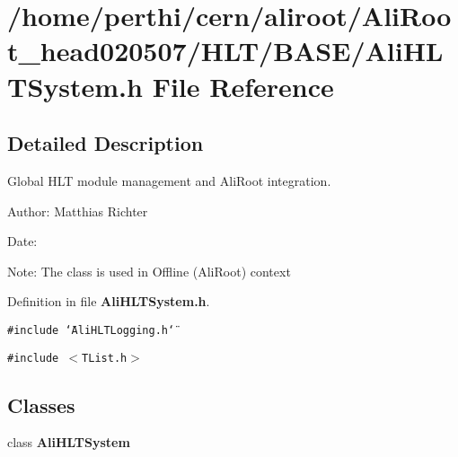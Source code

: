 \section{/home/perthi/cern/aliroot/Ali\-Root\_\-head020507/HLT/BASE/Ali\-HLTSystem.h File Reference}
\label{AliHLTSystem_8h}


\subsection{Detailed Description}
Global HLT module management and Ali\-Root integration. 

\begin{Desc}
\item[Author:]Matthias Richter \end{Desc}
\begin{Desc}
\item[Date:]\end{Desc}
\begin{Desc}
\item[Note:]The class is used in Offline (Ali\-Root) context\end{Desc}


Definition in file {\bf Ali\-HLTSystem.h}.

{\tt \#include \char`\"{}Ali\-HLTLogging.h\char`\"{}}\par
{\tt \#include $<$TList.h$>$}\par
\subsection*{Classes}
\begin{CompactItemize}
\item 
class {\bf Ali\-HLTSystem}
\end{CompactItemize}

